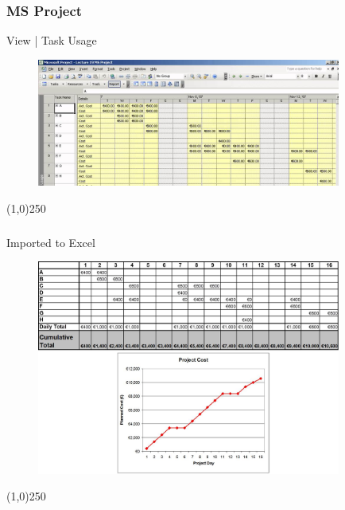 \begin{frame}
\frametitle{MS Project}
View | Task Usage\\\begin{figure}
	\centering
		\includegraphics[width = 10cm]{images/costtrack.jpg}
	\label{fig:costtrack}
\end{figure}
\end{frame}
\begin{center}\line(1,0){250}\end{center}






\begin{frame}
\frametitle{}
Imported to Excel
\begin{figure}
	\centering
		\includegraphics[width = 10cm]{images/useagexl.jpg}
	\label{fig:useagexl}
\end{figure}
\end{frame}
\begin{center}\line(1,0){250}\end{center}






